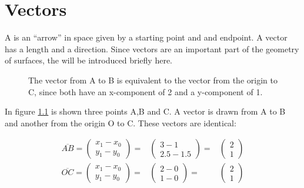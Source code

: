 \newcommand{\vp}{\vec{p}}
\newcommand{\vq}{\vec{q}}
\newcommand{\vr}{\vec{r}}

\chapter{Vectors}
\label{sec:vectors}

A  is an ``arrow'' in space given by a starting point and and endpoint. A vector 
has a length and a direction. Since vectors are an important part of the geometry of 
surfaces, the will be introduced briefly here.

\begin{figure}[h]
\begin{center}
  \caption{\small The vector from A to B is equivalent to the vector from the 
origin to C, since both have an x-component of 2 and a y-component of 1.}
  \label{fig-vec}
\end{center}
\end{figure}

In figure \ref{fig-vec} is shown three points A,B and C. A vector is drawn from A to B and 
another from the origin O to C. These vectors are identical:

\begin{eqnarray*}
    \overline{AB} = \begin{pmatrix} x_1 - x_0 \\  y_1 - y_0 \end{pmatrix} =&
              \begin{pmatrix} 3 - 1 \\  2.5  - 1.5 \end{pmatrix} =&
              \begin{pmatrix} 2 \\  1 \end{pmatrix} \\
    \overline{OC} = \begin{pmatrix} x_1 - x_0 \\  y_1 - y_0 \end{pmatrix} =&
              \begin{pmatrix} 2 - 0 \\  1  - 0 \end{pmatrix} =&
              \begin{pmatrix} 2 \\  1 \end{pmatrix}
\end{eqnarray*}


